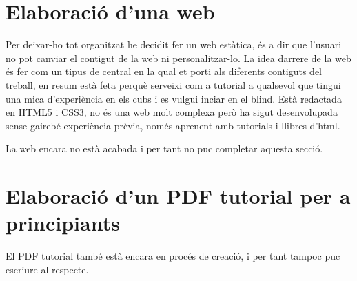 \section{Elaboració d'una web}

Per deixar-ho tot organitzat he decidit fer un web estàtica, és a dir que l'usuari no pot canviar el contigut de la web ni personalitzar-lo. La idea darrere de la web és fer com un tipus de central en la qual et porti als diferents contiguts del treball, en resum està feta perquè serveixi com a tutorial a qualsevol que tingui una mica d'experiència en els cubs i es vulgui inciar en el blind.
Està redactada en HTML5 i CSS3, no és una web molt complexa però ha sigut desenvolupada sense gairebé experiència prèvia, només aprenent amb tutorials i llibres d'html.

La web encara no està acabada i per tant no puc completar aquesta secció.


\section{Elaboració d'un PDF tutorial per a principiants}

El PDF tutorial també està encara en procés de creació, i per tant tampoc puc escriure al respecte.





